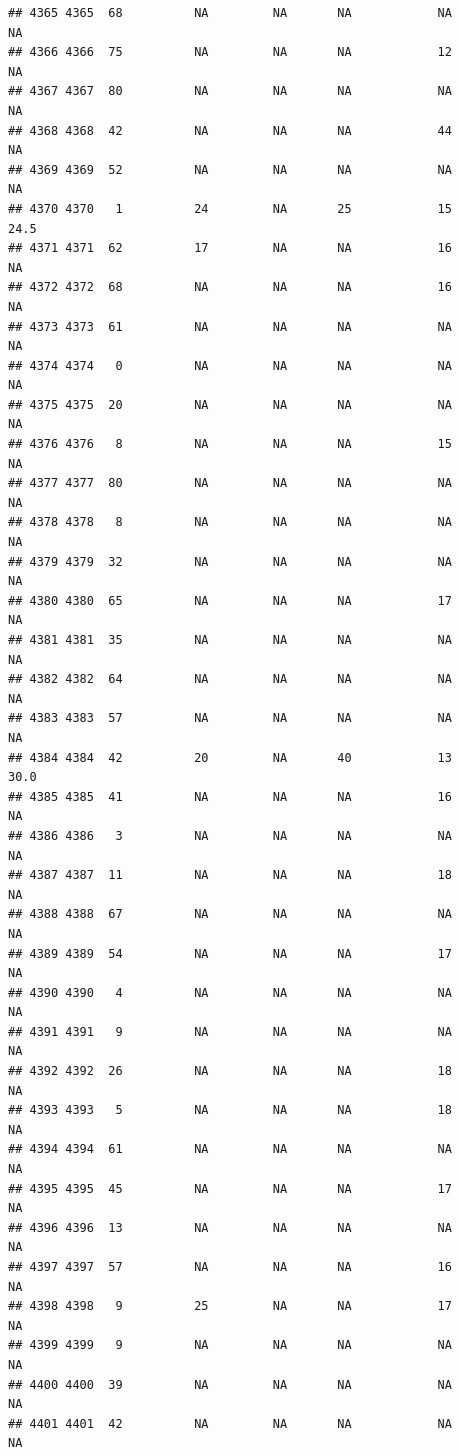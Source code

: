\documentclass[man]{apa6}
\begin{document}
\begin{verbatim}
## 4365 4365  68          NA         NA       NA            NA       NA
## 4366 4366  75          NA         NA       NA            12       NA
## 4367 4367  80          NA         NA       NA            NA       NA
## 4368 4368  42          NA         NA       NA            44       NA
## 4369 4369  52          NA         NA       NA            NA       NA
## 4370 4370   1          24         NA       25            15     24.5
## 4371 4371  62          17         NA       NA            16       NA
## 4372 4372  68          NA         NA       NA            16       NA
## 4373 4373  61          NA         NA       NA            NA       NA
## 4374 4374   0          NA         NA       NA            NA       NA
## 4375 4375  20          NA         NA       NA            NA       NA
## 4376 4376   8          NA         NA       NA            15       NA
## 4377 4377  80          NA         NA       NA            NA       NA
## 4378 4378   8          NA         NA       NA            NA       NA
## 4379 4379  32          NA         NA       NA            NA       NA
## 4380 4380  65          NA         NA       NA            17       NA
## 4381 4381  35          NA         NA       NA            NA       NA
## 4382 4382  64          NA         NA       NA            NA       NA
## 4383 4383  57          NA         NA       NA            NA       NA
## 4384 4384  42          20         NA       40            13     30.0
## 4385 4385  41          NA         NA       NA            16       NA
## 4386 4386   3          NA         NA       NA            NA       NA
## 4387 4387  11          NA         NA       NA            18       NA
## 4388 4388  67          NA         NA       NA            NA       NA
## 4389 4389  54          NA         NA       NA            17       NA
## 4390 4390   4          NA         NA       NA            NA       NA
## 4391 4391   9          NA         NA       NA            NA       NA
## 4392 4392  26          NA         NA       NA            18       NA
## 4393 4393   5          NA         NA       NA            18       NA
## 4394 4394  61          NA         NA       NA            NA       NA
## 4395 4395  45          NA         NA       NA            17       NA
## 4396 4396  13          NA         NA       NA            NA       NA
## 4397 4397  57          NA         NA       NA            16       NA
## 4398 4398   9          25         NA       NA            17       NA
## 4399 4399   9          NA         NA       NA            NA       NA
## 4400 4400  39          NA         NA       NA            NA       NA
## 4401 4401  42          NA         NA       NA            NA       NA

\end{verbatim}
\end{document}

